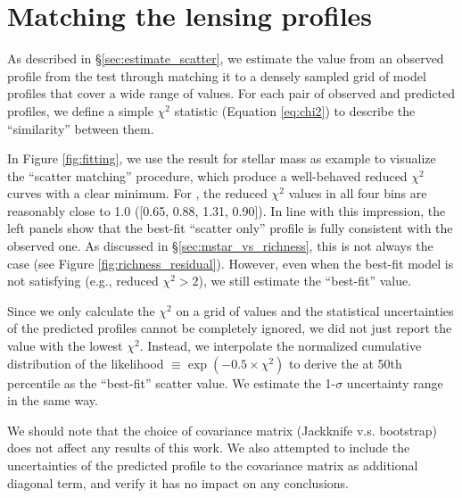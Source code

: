 \documentclass[fleqn,usenatbib,useAMS,english]{mnras}
\begin{document}
\section{Matching the lensing profiles}
    \label{app:fitting}

    As described in \S \ref{sec:estimate_scatter}, we estimate the \sigmh{} value
    from an observed \dsigma{} profile from the \topn{} test through matching it to a densely
    sampled grid of model \dsigma{} profiles that cover a wide range of \sigmh{}
    values.
    For each pair of observed and predicted \dsigma{} profiles, we define a simple $\chi^2$
    statistic (Equation \ref{eq:chi2}) to describe the ``similarity'' between them.

    In Figure \ref{fig:fitting}, we use the \topn{} result for  stellar mass as example
    to visualize the ``scatter matching'' procedure, which produce a well-behaved reduced $\chi^2$
    curves with a clear minimum.
    For , the reduced $\chi^2$ values in all four \topn{} bins are reasonably close
    to 1.0 ([0.65, 0.88, 1.31, 0.90]).
    In line with this impression, the left panels show that the best-fit ``scatter only'' \dsigma{}
    profile is fully consistent with the observed one.
    As discussed in \S \ref{sec:mstar_vs_richness}, this is not always the case (see
    Figure \ref{fig:richness_residual}).
    However, even when the best-fit model is not satisfying (e.g., reduced $\chi^2 >2$), we still
    estimate the ``best-fit'' \sigmh{} value.

    Since we only calculate the $\chi^2$ on a grid of \sigmh{} values and the statistical
    uncertainties of the predicted \dsigma{} profiles cannot be completely ignored, we did not
    just report the \sigmh{} value with the lowest $\chi^2$.
    Instead, we interpolate the normalized cumulative distribution of the likelihood $\equiv
    \exp{(-0.5 \times \chi^2)}$ to derive the \sigmh{} at 50th percentile as the ``best-fit''
    scatter value.
    We estimate the 1-$\sigma$ uncertainty range in the same way.

    We should note that the choice of covariance matrix (Jackknife v.s. bootstrap) does not
    affect any results of this work.
    We also attempted to include the uncertainties of the predicted \dsigma{} profile to the
    covariance matrix as additional diagonal term, and verify it has no impact on any
    conclusions.
\end{document}
